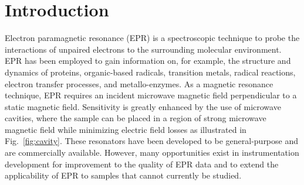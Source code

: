 \chapter[Introduction]{Introduction}

Electron paramagnetic resonance (EPR) is a spectroscopic technique to probe the interactions of unpaired electrons to the surrounding molecular environment. EPR has been employed to gain information on, for example, the structure and dynamics of proteins, organic-based radicals, transition metals, radical reactions, electron transfer processes, and metallo-enzymes. As a magnetic resonance technique, EPR requires an incident microwave magnetic field perpendicular to a static magnetic field.\cite{weil2007electron} Sensitivity is greatly enhanced by the use of microwave cavities, where the sample can be placed in a region of strong microwave magnetic field while minimizing electric field losses as illustrated in Fig.~\ref{fig:cavity}. These resonators have been developed to be general-purpose and are commercially available. However, many opportunities exist in instrumentation development for improvement to the quality of EPR data and to extend the applicability of EPR to samples that cannot currently be studied. 

